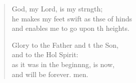 \begin{verse}
\begin{patverse}
God, my Lord, is my strngth;\Flex\\
he makes my feet swift as thse of hinds\Med\\
and enables me to go upon th heights.

Glory to the Father and t the Son,\Med\\
and to the Hol Spirit:\\
as it was in the beginn\pointup{\i}ng, is now,\Med\\
and will be forever. men. 
  \end{patverse}
\end{verse}
